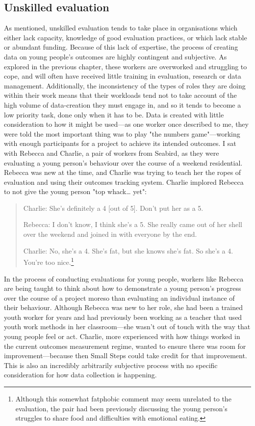 \subsection{Unskilled evaluation}
\label{subsec:6-4-1-unskilled-eval}
As mentioned, unskilled evaluation tends to take place in organisations which either lack capacity, knowledge of good evaluation practices, or which lack stable or abundant funding. Because of this lack of expertise, the process of creating data on young people's outcomes are highly contingent and subjective. As explored in the previous chapter, these workers are overworked and struggling to cope, and will often have received little training in evaluation, research or data management. Additionally, the inconsistency of the types of roles they are doing within their work means that their workloads tend not to take account of the high volume of data-creation they must engage in, and so it tends to become a low priority task, done only when it has to be. Data is created with little consideration to how it might be used—as one worker once described to me, they were told the most important thing was to play "the numbers game"—working with enough participants for a project to achieve its intended outcomes. I sat with Rebecca and Charlie, a pair of workers from Seabird, as they were evaluating a young person’s behaviour over the course of a weekend residential. Rebecca was new at the time, and Charlie was trying to teach her the ropes of evaluation and using their outcomes tracking system. Charlie implored Rebecca to not give the young person "top whack… yet":
\begin{quote}
Charlie: She’s definitely a 4 [out of 5]. Don’t put her as a 5.

Rebecca: I don’t know, I think she’s a 5. She really came out of her shell over the weekend and joined in with everyone by the end.

Charlie: No, she’s a 4. She’s fat, but she knows she’s fat. So she’s a 4. You’re too nice.\footnote{Although  this somewhat fatphobic comment may seem unrelated to the evaluation, the pair had been previously discussing the young person's struggles to share food and difficulties with emotional eating.}
\end{quote}
In the process of conducting evaluations for young people, workers like Rebecca are being taught to think about how to demonstrate a young person’s progress over the course of a project moreso than evaluating an individual instance of their behaviour. Although Rebecca was new to her role, she had been a trained youth worker for years and had previously been working as a teacher that used youth work methods in her classroom—she wasn't out of touch with the way that young people feel or act. Charlie, more experienced with how things worked in the current outcomes measurement regime, wanted to ensure there was room for improvement—because then Small Steps could take credit for that improvement. This is also an incredibly arbitrarily subjective process with no specific consideration for how data collection is happening.

